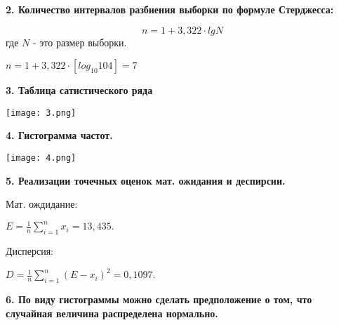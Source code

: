 \documentclass[]{article}
\begin{document}
	\vspace{10pt}
	
	\textbf{2. Количество интервалов разбиения выборки по формуле Стерджесса:}
	
	\vspace{10pt}
	
	$$n = 1 + 3,322 \cdot lg N$$ где $N $ - это размер выборки.
	
	\vspace{10pt}
	
	$n = 1 + 3,322 \cdot [log_{10} 104] = 7$ \\
	
	\vspace{10pt}
	
	\textbf{3. Таблица сатистического ряда}
	
	\vspace{10pt}
	
	\texttt{[image: 3.png]}
	
	\vspace{10pt}
	
	\textbf{4. Гистограмма частот.}
	
	\vspace{10pt}
	
	\texttt{[image: 4.png]}
	
	\vspace{10pt}
	
	\textbf{5. Реализации точечных оценок мат. ожидания и деспирсии.}
	
	\vspace{10pt}
	
	Мат. ождидание:
	
	\vspace{10pt}
	
	$E = \frac{1}{n} \sum\limits_{i=1}^n x_i = 13,435.$\\
	
	\vspace{10pt}
	
	Дисперсия:
	
	\vspace{10pt}
	
	$D =  \frac{1}{n} \sum\limits_{i=1}^n (E - x_i)^2 = 0,1097.$
	
	\vspace{10pt}
	
	\textbf{6. По виду гистограммы можно сделать предположение о том, что случайная величина распределена нормально.}
	
\end{document}
